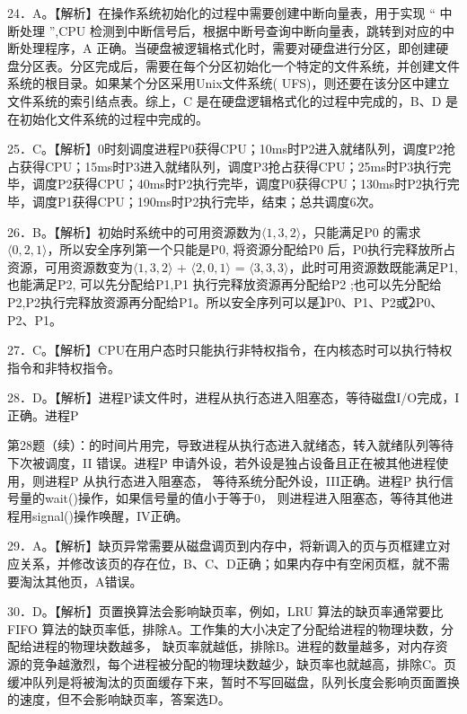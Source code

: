 \documentclass[UTF8,11pt]{ctexart}
\begin{document}
24．A。【解析】在操作系统初始化的过程中需要创建中断向量表，用于实现 “ 中断处理 ”,CPU 检测到中断信号后，根据中断号查询中断向量表，跳转到对应的中断处理程序，A 正确。当硬盘被逻辑格式化时，需要对硬盘进行分区，即创建硬盘分区表。分区完成后，需要在每个分区初始化一个特定的文件系统，并创建文件系统的根目录。如果某个分区采用Unix文件系统( UFS)，则还要在该分区中建立文件系统的索引结点表。综上，C 是在硬盘逻辑格式化的过程中完成的，B、D 是在初始化文件系统的过程中完成的。


25．C。【解析】0时刻调度进程P0获得CPU；10ms时P2进入就绪队列，调度P2抢占获得CPU；15ms时P3进入就绪队列，调度P3抢占获得CPU；25ms时P3执行完毕，调度P2获得CPU；40ms时P2执行完毕，调度P0获得CPU；130ms时P2执行完毕，调度P1获得CPU；190ms时P2执行完毕，结束；总共调度6次。


26．B。【解析】初始时系统中的可用资源数为\(\displaystyle \langle 1,\allowbreak  3,\allowbreak  2\rangle\)，只能满足P0 的需求\(\displaystyle \langle 0,\allowbreak  2,\allowbreak  1\rangle\)，所以安全序列第一个只能是P0, 将资源分配给P0 后，P0执行完释放所占资源，可用资源数变为\(\displaystyle \langle 1,\allowbreak  3,\allowbreak  2\rangle\) + \(\displaystyle \langle 2,\allowbreak  0,\allowbreak  1\rangle\) = \(\displaystyle \langle 3,\allowbreak  3,\allowbreak  3\rangle\)，此时可用资源数既能满足P1,也能满足P2, 可以先分配给P1,P1 执行完释放资源再分配给P2 ;也可以先分配给P2,P2执行完释放资源再分配给P1。所以安全序列可以是\textcircled{1}P0、P1、P2或\textcircled{2}P0、P2、P1。


27．C。【解析】CPU在用户态时只能执行非特权指令，在内核态时可以执行特权指令和非特权指令。


28．D。【解析】进程P读文件时，进程从执行态进入阻塞态，等待磁盘I/O完成，I正确。进程P


第28题（续）：的时间片用完，导致进程从执行态进入就绪态，转入就绪队列等待下次被调度，II 错误。进程P 申请外设，若外设是独占设备且正在被其他进程使用，则进程P 从执行态进入阻塞态， 等待系统分配外设，III正确。进程P 执行信号量的wait()操作，如果信号量的值小于等于0， 则进程进入阻塞态，等待其他进程用signal()操作唤醒，IV正确。


29．A。【解析】缺页异常需要从磁盘调页到内存中，将新调入的页与页框建立对应关系，并修改该页的存在位，B、C、D正确；如果内存中有空闲页框，就不需要淘汰其他页，A错误。


30．D。【解析】页置换算法会影响缺页率，例如，LRU 算法的缺页率通常要比FIFO 算法的缺页率低，排除A。工作集的大小决定了分配给进程的物理块数，分配给进程的物理块数越多， 缺页率就越低，排除B。进程的数量越多，对内存资源的竞争越激烈，每个进程被分配的物理块数越少，缺页率也就越高，排除C。页缓冲队列是将被淘汰的页面缓存下来，暂时不写回磁盘，队列长度会影响页面置换的速度，但不会影响缺页率，答案选D。
\end{document}
